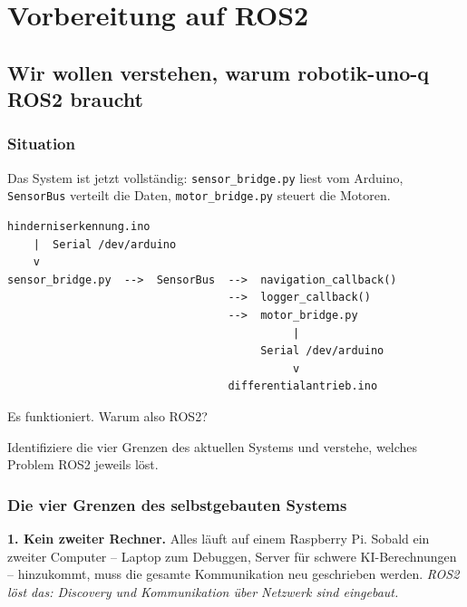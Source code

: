 \part{Vorbereitung auf ROS2}

\chapter{Wir wollen verstehen, warum robotik-uno-q ROS2 braucht}

\kapitelstruktur

\section{Situation}

Das System ist jetzt vollständig:
\texttt{sensor\_bridge.py} liest vom Arduino,
\texttt{SensorBus} verteilt die Daten,
\texttt{motor\_bridge.py} steuert die Motoren.

\begin{lstlisting}[style=text]
hinderniserkennung.ino
    |  Serial /dev/arduino
    v
sensor_bridge.py  -->  SensorBus  -->  navigation_callback()
                                  -->  logger_callback()
                                  -->  motor_bridge.py
                                            |
                                       Serial /dev/arduino
                                            v
                                  differentialantrieb.ino
\end{lstlisting}

Es funktioniert. Warum also ROS2?

\begin{aufgabeBox}
Identifiziere die vier Grenzen des aktuellen Systems und
verstehe, welches Problem ROS2 jeweils löst.
\end{aufgabeBox}

\section{Die vier Grenzen des selbstgebauten Systems}

\textbf{1. Kein zweiter Rechner.}
Alles läuft auf einem Raspberry Pi. Sobald ein zweiter
Computer -- Laptop zum Debuggen, Server für schwere
KI-Berechnungen -- hinzukommt, muss die gesamte
Kommunikation neu geschrieben werden.
\emph{ROS2 löst das: Discovery und Kommunikation über Netzwerk
sind eingebaut.}

